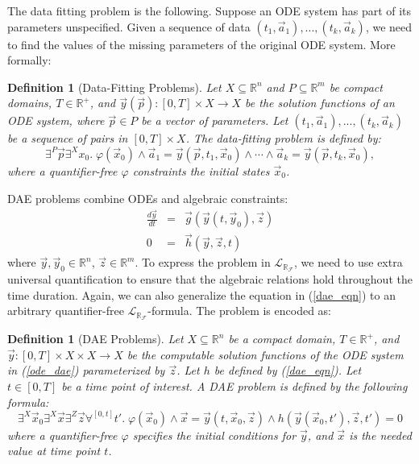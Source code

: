 \documentclass[12pt]{article}
\newtheorem{definition}[theorem]{Definition}
\newcommand{\lrf}{\mathcal{L}_{\mathbb{R}_{\mathcal{F}}}}
\begin{document}
The data fitting problem is the following. Suppose an ODE system has part of its parameters unspecified. Given a sequence of data $(t_1, \vec a_1), ..., (t_k, \vec a_k)$, we need to find the values of the missing parameters of the original ODE system. More formally:
\begin{definition}[Data-Fitting Problems]
Let $X\subseteq \mathbb{R}^n$ and $P\subseteq \mathbb{R}^m$ be compact domains, $T\in \mathbb{R}^+$, and $\vec y(\vec p): [0,T]\times X\rightarrow X$ be the solution functions of an ODE system, where $\vec p\in P$ be a vector of parameters. Let $(t_1,\vec a_1), ..., (t_k, \vec a_k)$ be a sequence of pairs in $[0,T]\times X$. The data-fitting problem is defined by:
$$\exists^P \vec p\exists^X x_0.\; \varphi(\vec x_0)\wedge \vec a_1 = \vec y(\vec p, t_1, \vec x_0)\wedge \cdots \wedge \vec a_k = \vec y(\vec p, t_k, \vec x_0),$$
where a quantifier-free $\varphi$ constraints the initial states $\vec x_0$. 
\end{definition}


 DAE problems combine ODEs and algebraic constraints:
\begin{eqnarray}
\frac{d \vec y}{dt} &=& \vec g(\vec y(t, \vec y_0), \vec z)\label{ode_dae}\\
0 &=& \vec h(\vec y, \vec z, t)\label{dae_eqn}
\end{eqnarray}
where $\vec y, \vec y_0\in \mathbb{R}^n$, $\vec z\in \mathbb{R}^m$. To express the problem in $\lrf$, we need to use extra universal quantification to ensure that the algebraic relations hold throughout the time duration. Again, we can also generalize the equation in (\ref{dae_eqn}) to an arbitrary quantifier-free $\lrf$-formula. The problem is encoded as:
\begin{definition}[DAE Problems]
Let $X\subseteq \mathbb{R}^n$ be a compact domain, $T\in \mathbb{R}^+$, and $\vec y: [0,T]\times X\times X\rightarrow X$ be the computable solution functions of the ODE system in (\ref{ode_dae}) parameterized by $\vec z$. Let $h$ be defined by (\ref{dae_eqn}). Let $t\in [0,T]$ be a time point of interest. A DAE problem is defined by the following formula:
$$
\exists^X \vec x_0 \exists^X \vec x \exists^Z \vec z \forall^{[0,t]} t'.\;
\varphi(\vec x_0)\wedge \vec x = \vec y (t, \vec x_0, \vec z) \wedge h(\vec y(\vec x_0, t'), \vec z, t')=0
$$
where a quantifier-free $\varphi$ specifies the initial conditions for $\vec y$, and $\vec x$ is the needed value at time point $t$. 
\end{definition}
\end{document}
